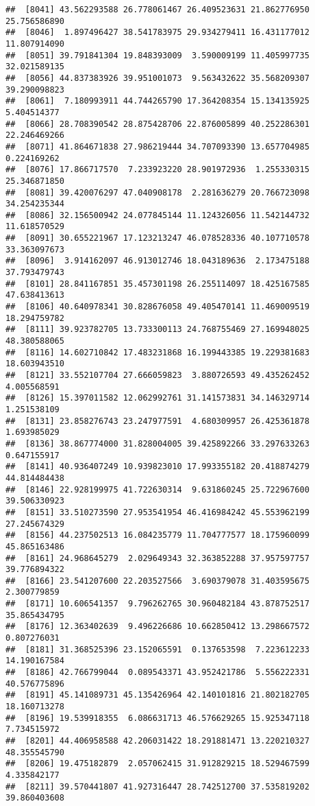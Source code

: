 \documentclass[
]{article}
\begin{document}
\begin{verbatim}
##  [8041] 43.562293588 26.778061467 26.409523631 21.862776950 25.756586890
##  [8046]  1.897496427 38.541783975 29.934279411 16.431177012 11.807914090
##  [8051] 39.791841304 19.848393009  3.590009199 11.405997735 32.021589135
##  [8056] 44.837383926 39.951001073  9.563432622 35.568209307 39.290098823
##  [8061]  7.180993911 44.744265790 17.364208354 15.134135925  5.404514377
##  [8066] 28.708390542 28.875428706 22.876005899 40.252286301 22.246469266
##  [8071] 41.864671838 27.986219444 34.707093390 13.657704985  0.224169262
##  [8076] 17.866717570  7.233923220 28.901972936  1.255330315 25.346871850
##  [8081] 39.420076297 47.040908178  2.281636279 20.766723098 34.254235344
##  [8086] 32.156500942 24.077845144 11.124326056 11.542144732 11.618570529
##  [8091] 30.655221967 17.123213247 46.078528336 40.107710578 33.363097673
##  [8096]  3.914162097 46.913012746 18.043189636  2.173475188 37.793479743
##  [8101] 28.841167851 35.457301198 26.255114097 18.425167585 47.638413613
##  [8106] 40.640978341 30.828676058 49.405470141 11.469009519 18.294759782
##  [8111] 39.923782705 13.733300113 24.768755469 27.169948025 48.380588065
##  [8116] 14.602710842 17.483231868 16.199443385 19.229381683 18.603943510
##  [8121] 33.552107704 27.666059823  3.880726593 49.435262452  4.005568591
##  [8126] 15.397011582 12.062992761 31.141573831 34.146329714  1.251538109
##  [8131] 23.858276743 23.247977591  4.680309957 26.425361878  1.693985029
##  [8136] 38.867774000 31.828004005 39.425892266 33.297633263  0.647155917
##  [8141] 40.936407249 10.939823010 17.993355182 20.418874279 44.814484438
##  [8146] 22.928199975 41.722630314  9.631860245 25.722967600 39.506330923
##  [8151] 33.510273590 27.953541954 46.416984242 45.553962199 27.245674329
##  [8156] 44.237502513 16.084235779 11.704777577 18.175960099 45.865163486
##  [8161] 24.968645279  2.029649343 32.363852288 37.957597757 39.776894322
##  [8166] 23.541207600 22.203527566  3.690379078 31.403595675  2.300779859
##  [8171] 10.606541357  9.796262765 30.960482184 43.878752517 35.865434795
##  [8176] 12.363402639  9.496226686 10.662850412 13.298667572  0.807276031
##  [8181] 31.368525396 23.152065591  0.137653598  7.223612233 14.190167584
##  [8186] 42.766799044  0.089543371 43.952421786  5.556222331 40.576775896
##  [8191] 45.141089731 45.135426964 42.140101816 21.802182705 18.160713278
##  [8196] 19.539918355  6.086631713 46.576629265 15.925347118  7.734515972
##  [8201] 44.406958588 42.206031422 18.291881471 13.220210327 48.355545790
##  [8206] 19.475182879  2.057062415 31.912829215 18.529467599  4.335842177
##  [8211] 39.570441807 41.927316447 28.742512700 37.535819202 39.860403608

\end{verbatim}
\end{document}
